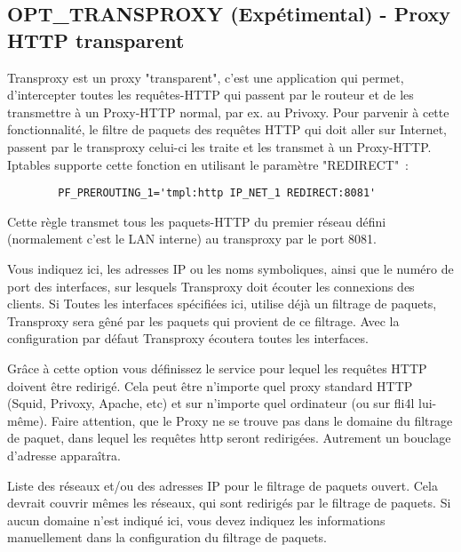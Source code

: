 \subsection{OPT\_TRANSPROXY (Expétimental) - Proxy HTTP transparent}

Transproxy est un proxy "transparent", c'est une application qui permet,
d'intercepter toutes les requêtes-HTTP qui passent par le routeur et de
les transmettre à un Proxy-HTTP normal, par ex. au Privoxy. Pour parvenir
à cette fonctionnalité, le filtre de paquets des requêtes HTTP qui doit
aller sur Internet, passent par le transproxy celui-ci les traite et les
transmet à un Proxy-HTTP. Iptables supporte cette fonction en utilisant
le paramètre "REDIRECT"~:

\begin{verbatim}
        PF_PREROUTING_1='tmpl:http IP_NET_1 REDIRECT:8081'
\end{verbatim}

Cette règle transmet tous les paquets-HTTP du premier réseau défini
(normalement c'est le LAN interne) au transproxy par le port 8081.

\begin{description}

        {Vous indiquez ici, les adresses IP ou les noms symboliques, ainsi
        que le numéro de port des interfaces, sur lesquels Transproxy doit
        écouter les connexions des clients. Si Toutes les interfaces spécifiées
        ici, utilise déjà un filtrage de paquets, Transproxy sera gêné
        par les paquets qui provient de ce filtrage. Avec la configuration
        par défaut  Transproxy écoutera toutes les interfaces.}


        {Grâce à cette option vous définissez le service pour lequel les requêtes
        HTTP doivent être redirigé. Cela peut être n'importe quel proxy standard
        HTTP (Squid, Privoxy, Apache, etc) et sur n'importe quel ordinateur (ou
        sur fli4l lui-même). Faire attention, que le Proxy ne se trouve pas dans
        le domaine du filtrage de paquet, dans lequel les requêtes http seront
        redirigées. Autrement un bouclage d'adresse apparaîtra.}


        {Liste des réseaux et/ou des adresses IP pour le filtrage de paquets
        ouvert. Cela devrait couvrir mêmes les réseaux, qui sont redirigés par
        le filtrage de paquets. Si aucun domaine n'est indiqué ici, vous devez
        indiquez les informations manuellement dans la configuration du filtrage
        de paquets.}
\end{description}
